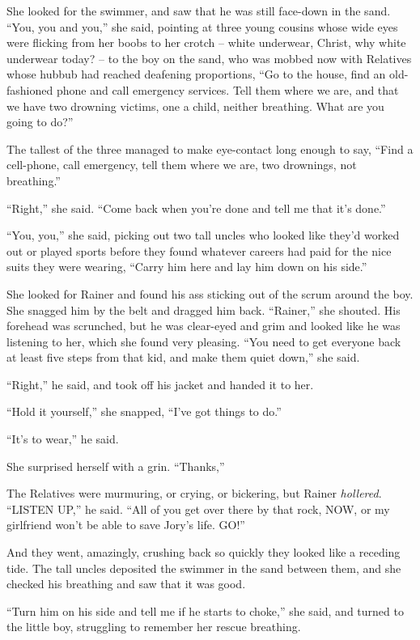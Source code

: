 She looked for the swimmer, and saw that he was still face-down in the 
sand. “You, you and you,” she said, pointing at three young cousins 
whose wide eyes were flicking from her boobs to her crotch -- white 
underwear, Christ, why white underwear today? -- to the boy on the 
sand, who was mobbed now with Relatives whose hubbub had reached 
deafening proportions, “Go to the house, find an old-fashioned phone 
and call emergency services. Tell them where we are, and that we have 
two drowning victims, one a child, neither breathing. What are you 
going to do?”

The tallest of the three managed to make eye-contact long enough to 
say, “Find a cell-phone, call emergency, tell them where we are, two 
drownings, not breathing.”

“Right,” she said. “Come back when you're done and tell me that 
it's done.”

“You, you,” she said, picking out two tall uncles who looked like 
they'd worked out or played sports before they found whatever careers 
had paid for the nice suits they were wearing, “Carry him here and 
lay him down on his side.”

She looked for Rainer and found his ass sticking out of the scrum 
around the boy. She snagged him by the belt and dragged him back. 
“Rainer,” she shouted. His forehead was scrunched, but he was 
clear-eyed and grim and looked like he was listening to her, which she 
found very pleasing. “You need to get everyone back at least five 
steps from that kid, and make them quiet down,” she said.

“Right,” he said, and took off his jacket and handed it to her.

“Hold it yourself,” she snapped, “I've got things to do.”

“It's to wear,” he said.

She surprised herself with a grin. “Thanks,”

The Relatives were murmuring, or crying, or bickering, but Rainer 
\emph{hollered}. “LISTEN UP,” he said. “All of you get over there 
by that rock, NOW, or my girlfriend won't be able to save Jory's life. 
GO!”

And they went, amazingly, crushing back so quickly they looked like a 
receding tide. The tall uncles deposited the swimmer in the sand 
between them, and she checked his breathing and saw that it was good.

“Turn him on his side and tell me if he starts to choke,” she said, 
and turned to the little boy, struggling to remember her rescue 
breathing.

